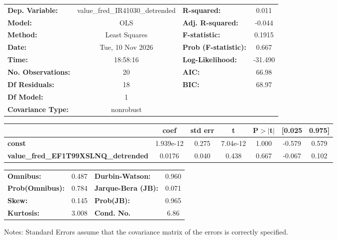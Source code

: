 \begin{center}
\begin{tabular}{lclc}
\toprule
\textbf{Dep. Variable:}                      & value\_fred\_IR41030\_detrended & \textbf{  R-squared:         } &     0.011   \\
\textbf{Model:}                              &               OLS               & \textbf{  Adj. R-squared:    } &    -0.044   \\
\textbf{Method:}                             &          Least Squares          & \textbf{  F-statistic:       } &    0.1915   \\
\textbf{Date:}                               &         Tue, 10 Nov 2026        & \textbf{  Prob (F-statistic):} &    0.667    \\
\textbf{Time:}                               &             18:58:16            & \textbf{  Log-Likelihood:    } &   -31.490   \\
\textbf{No. Observations:}                   &                  20             & \textbf{  AIC:               } &     66.98   \\
\textbf{Df Residuals:}                       &                  18             & \textbf{  BIC:               } &     68.97   \\
\textbf{Df Model:}                           &                   1             & \textbf{                     } &             \\
\textbf{Covariance Type:}                    &            nonrobust            & \textbf{                     } &             \\
\bottomrule
\end{tabular}
\begin{tabular}{lcccccc}
                                             & \textbf{coef} & \textbf{std err} & \textbf{t} & \textbf{P$> |$t$|$} & \textbf{[0.025} & \textbf{0.975]}  \\
\midrule
\textbf{const}                               &    1.939e-12  &        0.275     &  7.04e-12  &         1.000        &       -0.579    &        0.579     \\
\textbf{value\_fred\_EF1T99XSLNQ\_detrended} &       0.0176  &        0.040     &     0.438  &         0.667        &       -0.067    &        0.102     \\
\bottomrule
\end{tabular}
\begin{tabular}{lclc}
\textbf{Omnibus:}       &  0.487 & \textbf{  Durbin-Watson:     } &    0.960  \\
\textbf{Prob(Omnibus):} &  0.784 & \textbf{  Jarque-Bera (JB):  } &    0.071  \\
\textbf{Skew:}          &  0.145 & \textbf{  Prob(JB):          } &    0.965  \\
\textbf{Kurtosis:}      &  3.008 & \textbf{  Cond. No.          } &     6.86  \\
\bottomrule
\end{tabular}
\end{center}

Notes: \newline
 [1] Standard Errors assume that the covariance matrix of the errors is correctly specified.